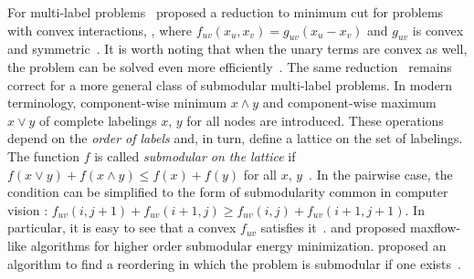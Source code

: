 %
%

For multi-label problems~\citeauthor{Ishikawa03} proposed a reduction to minimum cut for problems with convex interactions, \ie, where $f_{uv}(x_u,x_v) = g_{uv}(x_u - x_v)$ and $g_{uv}$ is convex and symmetric~\cite{Ishikawa03}. 
It is worth noting that when the unary terms are convex as well, the problem can be solved even more efficiently~\cite{Hochbaum-2001-MRF,Kolmogorov05primal-dualalgorithm}. %
The same reduction~\cite{Ishikawa03} remains correct for a more general class of submodular multi-label problems.
In modern terminology, component-wise minimum $x \wedge y$ and component-wise maximum $x \vee y$ of complete labelings $x$, $y$ for all nodes are introduced. These operations depend on the {\em order of labels} and, in turn, define a lattice on the set of labelings. The function $f$ is called {\em submodular on the lattice} if $f(x \vee y) + f(x \wedge y) \leq f(x) + f(y)$ for all $x$, $y$~\cite{Topkis-78}.
In the pairwise case, the condition can be simplified to the form of submodularity common in computer vision \cite{ramalingam2008exact}:
$f_{uv}(i, j+1) + f_{uv}(i+1, j) \geq f_{uv}(i, j) + f_{uv}(i+1, j+1).$
In particular, it is easy to see that a convex $f_{uv}$ satisfies it~\cite{Ishikawa03}.
\citet{Kolmogorov-10} and \citet{Arora-12} proposed maxflow-like algorithms for higher order submodular energy minimization. 
\citeauthor{DSchlesinger-07-permuted} proposed an algorithm to find a reordering in which the problem is submodular if one exists~\cite{DSchlesinger-07-permuted}. 
